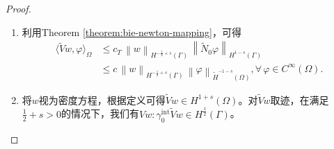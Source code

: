 \begin{proof}
\begin{enumerate}
  \item 利用Theorem \ref{theorem:bie-newton-mapping}，可得
  \begin{equation*}
    \begin{split}
      \langle \widetilde{V} w, \varphi \rangle_{\Omega}
      & \le
      c_{T} \, \left\| w \right\|_{H^{-\frac{1}{2} + s}(\Gamma)} \,
      \left\| \widetilde{N}_{0} \varphi \right\|_{H^{1 - s}(\Gamma)} \\
      & \le
      c \,  \left\| w \right\|_{H^{-\frac{1}{2} + s}(\Gamma)} \,
      \left\| \varphi \right\|_{\widetilde{H}^{-1-s}(\Omega)}, \forall \, \varphi \in C^{\infty}(\Omega).
    \end{split}
  \end{equation*}

  \item 将$w$视为密度方程，根据定义可得$\widetilde{V} w \in H^{1+s}(\Omega)$。对$\widetilde{V} w$取迹，在满足$\frac{1}{2} + s >0$的情况下，我们有$V w : \gamma_{0}^{\text{int}} \widetilde{V} w \in H^{\frac{1}{2}} (\Gamma)$。
  \end{enumerate}
\end{proof}


